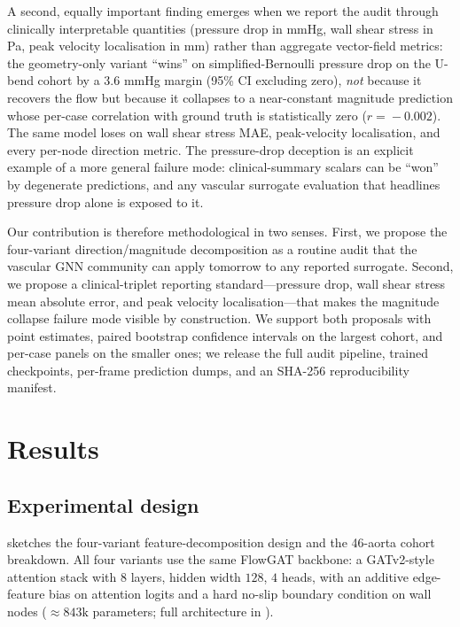 \documentclass[10pt,a4paper]{article}
\begin{document}
A second, equally important finding emerges when we report the
audit through clinically interpretable quantities (pressure drop in
mmHg, wall shear stress in Pa, peak velocity localisation in mm)
rather than aggregate vector-field metrics: the geometry-only
variant ``wins'' on simplified-Bernoulli pressure drop on the U-bend
cohort by a 3.6 mmHg margin (95\% CI excluding zero), \emph{not}
because it recovers the flow but because it collapses to a
near-constant magnitude prediction whose per-case correlation with
ground truth is statistically zero ($r\!=\!-0.002$). The same model
loses on wall shear stress MAE, peak-velocity localisation, and
every per-node direction metric. The pressure-drop deception is an
explicit example of a more general failure mode: clinical-summary
scalars can be ``won'' by degenerate predictions, and any vascular
surrogate evaluation that headlines pressure drop alone is exposed
to it.

Our contribution is therefore methodological in two senses. First,
we propose the four-variant direction/magnitude decomposition as a
routine audit that the vascular GNN community can apply tomorrow to
any reported surrogate. Second, we propose a clinical-triplet
reporting standard---pressure drop, wall shear stress mean absolute
error, and peak velocity localisation---that makes the magnitude
collapse failure mode visible by construction. We support both
proposals with point estimates, paired bootstrap confidence
intervals on the largest cohort, and per-case panels on the smaller
ones; we release the full audit pipeline, trained checkpoints,
per-frame prediction dumps, and an SHA-256 reproducibility manifest.

\section*{Results}

\subsection*{Experimental design}

 sketches the four-variant feature-decomposition design
and the 46-aorta cohort breakdown.
All four variants use the same FlowGAT backbone: a GATv2-style
attention stack with $8$ layers, hidden width $128$, $4$ heads, with
an additive edge-feature bias on attention logits and a hard
no-slip boundary condition on wall nodes ($\approx 843\mathrm{k}$
parameters; full architecture in ).
\end{document}
